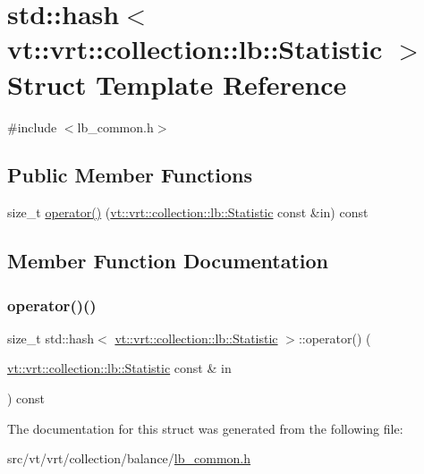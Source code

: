 \hypertarget{structstd_1_1hash_3_01vt_1_1vrt_1_1collection_1_1lb_1_1_statistic_01_4}{}\section{std\+:\+:hash$<$ vt\+:\+:vrt\+:\+:collection\+:\+:lb\+:\+:Statistic $>$ Struct Template Reference}
\label{structstd_1_1hash_3_01vt_1_1vrt_1_1collection_1_1lb_1_1_statistic_01_4}


{\ttfamily \#include $<$lb\+\_\+common.\+h$>$}

\subsection*{Public Member Functions}
\begin{DoxyCompactItemize}
\item 
size\+\_\+t \hyperlink{structstd_1_1hash_3_01vt_1_1vrt_1_1collection_1_1lb_1_1_statistic_01_4_a966356e67a02cabf2d52eecc24ed4017}{operator()} (\hyperlink{namespacevt_1_1vrt_1_1collection_1_1lb_af0e20ef9afee77295053aa83bf1348b1}{vt\+::vrt\+::collection\+::lb\+::\+Statistic} const \&in) const
\end{DoxyCompactItemize}


\subsection{Member Function Documentation}
\mbox{\label{structstd_1_1hash_3_01vt_1_1vrt_1_1collection_1_1lb_1_1_statistic_01_4_a966356e67a02cabf2d52eecc24ed4017}} 
\subsubsection{\texorpdfstring{operator()()}{operator()()}}
{\footnotesize\ttfamily size\+\_\+t std\+::hash$<$ \hyperlink{namespacevt_1_1vrt_1_1collection_1_1lb_af0e20ef9afee77295053aa83bf1348b1}{vt\+::vrt\+::collection\+::lb\+::\+Statistic} $>$\+::operator() (\begin{DoxyParamCaption}\item[{\hyperlink{namespacevt_1_1vrt_1_1collection_1_1lb_af0e20ef9afee77295053aa83bf1348b1}{vt\+::vrt\+::collection\+::lb\+::\+Statistic} const \&}]{in }\end{DoxyParamCaption}) const\hspace{0.3cm}{\ttfamily [inline]}}



The documentation for this struct was generated from the following file\+:\begin{DoxyCompactItemize}
\item 
src/vt/vrt/collection/balance/\hyperlink{lb__common_8h}{lb\+\_\+common.\+h}\end{DoxyCompactItemize}
